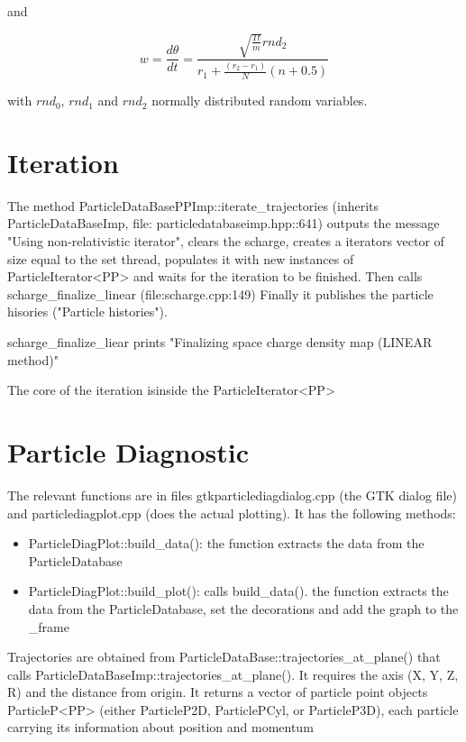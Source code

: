 \documentclass[12pt,a4paper]{article}
\begin{document}
and

\begin{equation}
	w=\frac{d\theta}{dt}=\frac{\sqrt{\frac{Tt}{m}}rnd_{2}}{r_{1} + \frac{(r_{2}-r_{1})}{N}(n+0.5)}
\end{equation}

with $rnd_{0}$, $rnd_{1}$ and $rnd_{2}$ normally distributed random variables.


\section{Iteration}

The method ParticleDataBasePPImp::iterate\_trajectories (inherits ParticleDataBaseImp, file: particledatabaseimp.hpp::641) outputs the message "Using non-relativistic iterator", clears the scharge, creates a iterators vector of size equal to the set thread, populates it with new instances of ParticleIterator<PP> and waits for the iteration to be finished. Then calls scharge\_finalize\_linear (file:scharge.cpp:149) Finally it publishes the particle hisories ("Particle histories").

scharge\_finalize\_liear prints "Finalizing space charge density map (LINEAR method)"

The core of the iteration isinside the ParticleIterator<PP>


\section{Particle Diagnostic}

The relevant functions are in files gtkparticlediagdialog.cpp (the GTK dialog file) and particlediagplot.cpp (does the actual plotting). It has the following methods:

\begin{itemize}
	\item ParticleDiagPlot::build\_data(): the function extracts the data from the ParticleDatabase
	\item ParticleDiagPlot::build\_plot(): calls build\_data(). the function extracts the data from the ParticleDatabase, set the decorations and add the graph to the \_frame
\end{itemize}


Trajectories are obtained from ParticleDataBase::trajectories\_at\_plane() that calls ParticleDataBaseImp::trajectories\_at\_plane(). It requires the axis (X, Y, Z, R) and the distance from origin. It returns a vector of particle point objects ParticleP<PP> (either ParticleP2D, ParticlePCyl, or ParticleP3D), each particle carrying its information about position and momentum
\end{document}
